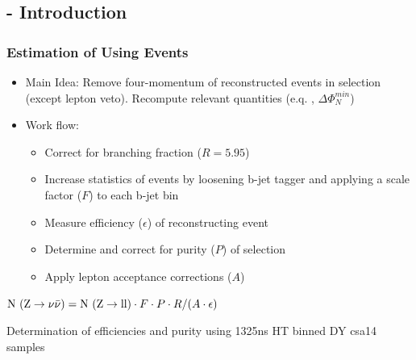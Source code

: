 \documentclass{beamer}
\begin{document}
\subsection{\Zll - Introduction}
\begin{frame}
\frametitle{Estimation of \ZInvJets  Using \Zll Events}
\begin{itemize}
 \item Main Idea: Remove four-momentum of reconstructed \Zll events in selection (except lepton veto). Recompute relevant quantities (e.q. \met, $\Delta\Phi_{N}^{min}$)
 \item Work flow:
 \begin{itemize}
  \item Correct for branching fraction ($R = 5.95$)
  \item Increase statistics of \Zll events by loosening b-jet tagger and applying a scale factor ($F$) to each b-jet bin
  \item Measure efficiency ($\epsilon$) of reconstructing \Zll event
  \item Determine and correct for purity ($P$) of \Zll selection
  \item Apply lepton acceptance corrections ($A$)
 \end{itemize}
\end{itemize}
  \begin{centering}
  $\text{N }(\text{Z}\rightarrow\nu\bar{\nu}) = \text{N }(\text{Z}\rightarrow\text{ll})\cdot F \cdot P \cdot R / (A\cdot \epsilon)$
  \end{centering}
  \begin{block}{}
\centering
Determination of \Zll efficiencies and purity using 13\tev 25ns HT binned DY csa14 samples
\end{block}
\end{frame}

\end{document}
